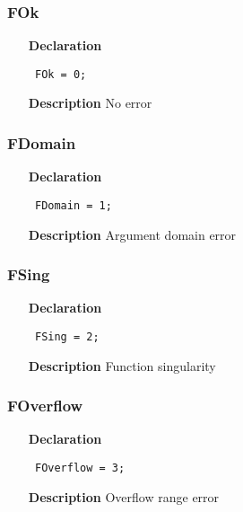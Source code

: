 \documentclass[12pt,a4paper,oneside]{report}
\newcommand{\declarationitem}[1]{\textbf{#1}}
\newcommand{\descriptiontitle}[1]{\textbf{#1}}
\newcommand{\code}[1]{\texttt{#1}}
\begin{document}
\subsubsection{FOk}
\label{uErrors-FOk}
\begin{itemize}\item[\declarationitem{Declaration}\hfill]
	\begin{flushleft}
		\code{
			FOk        = 0;}
		
	\end{flushleft}
	
	\par
	\item[\descriptiontitle{Description}]
	No error
	
\end{itemize}
\subsubsection{FDomain}
\label{uErrors-FDomain}
\begin{itemize}\item[\declarationitem{Declaration}\hfill]
	\begin{flushleft}
		\code{
			FDomain    = 1;}
		
	\end{flushleft}
	
	\par
	\item[\descriptiontitle{Description}]
	Argument domain error
	
\end{itemize}
\subsubsection{FSing}
\label{uErrors-FSing}
\begin{itemize}\item[\declarationitem{Declaration}\hfill]
	\begin{flushleft}
		\code{
			FSing      = 2;}
		
	\end{flushleft}
	
	\par
	\item[\descriptiontitle{Description}]
	Function singularity
	
\end{itemize}
\subsubsection{FOverflow}
\label{uErrors-FOverflow}
\begin{itemize}\item[\declarationitem{Declaration}\hfill]
	\begin{flushleft}
		\code{
			FOverflow  = 3;}
		
	\end{flushleft}
	
	\par
	\item[\descriptiontitle{Description}]
	Overflow range error
	
\end{itemize}
\end{document}
